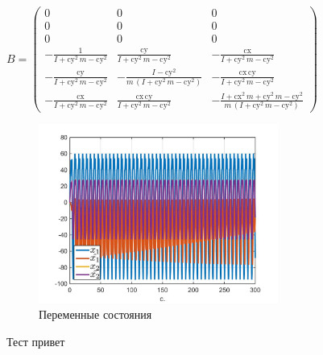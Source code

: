 \documentclass[fleqn, a4paper, 12pt, russian]{article}
\begin{document}
\begin{landscape}
$B = (\begin{array}{ccc} 0 & 0 & 0\\ 0 & 0 & 0\\ 0 & 0 & 0\\ -\frac{1}{I+{\mathrm{cy}}^2\,m-{\mathrm{cy}}^2} & \frac{\mathrm{cy}}{I+{\mathrm{cy}}^2\,m-{\mathrm{cy}}^2} & -\frac{\mathrm{cx}}{I+{\mathrm{cy}}^2\,m-{\mathrm{cy}}^2}\\ -\frac{\mathrm{cy}}{I+{\mathrm{cy}}^2\,m-{\mathrm{cy}}^2} & -\frac{I-{\mathrm{cy}}^2}{m\,(I+{\mathrm{cy}}^2\,m-{\mathrm{cy}}^2)} & -\frac{\mathrm{cx}\,\mathrm{cy}}{I+{\mathrm{cy}}^2\,m-{\mathrm{cy}}^2}\\ -\frac{\mathrm{cx}}{I+{\mathrm{cy}}^2\,m-{\mathrm{cy}}^2} & \frac{\mathrm{cx}\,\mathrm{cy}}{I+{\mathrm{cy}}^2\,m-{\mathrm{cy}}^2} & -\frac{I+{\mathrm{cx}}^2\,m+{\mathrm{cy}}^2\,m-{\mathrm{cy}}^2}{m\,(I+{\mathrm{cy}}^2\,m-{\mathrm{cy}}^2)} \end{array})$



\begin{figure}[!h]
	\centering
	\includegraphics[width = 0.7\textwidth]{modeling62-x.jpg}
	\caption{Переменные состояния} 
	\label{modeling62-x}
\end{figure}

Тест привет

\end{landscape}
	
\end{document}
